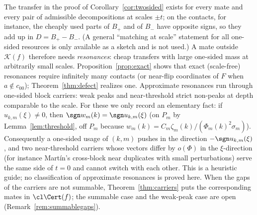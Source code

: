 \begin{remark}\label{rem:resonancetypes}
The transfer in the proof of Corollary~\ref{cor:twosided} exists for every
mate and every pair of admissible decompositions at scales $\pm t$; on the
contacts, for instance, the cheaply used parts of $B_+$ and of $B_-$ have
opposite signs, so they add up in $D=B_+-B_-$.  (A general ``matching at
scale'' statement for all one-sided resources is only available as a
sketch and is not used.)  A mate outside $\mathcal
K(f)$ therefore needs \emph{resonances}: cheap transfers with large
one-sided mass at arbitrarily small scales.  Proposition~\ref{prop:exact}
shows that exact (scale-free) resonances require infinitely many contacts
(or near-flip coordinates of $F$ when $a\notin c_{00}$);
Theorem~\ref{thm:defect} realizes one.  Approximate resonances run through
one-sided block carriers: weak peaks and near-threshold strict non-peaks
at depth comparable to the scale.  For these we only record an elementary
fact: if $u_{k,m}(\xi)\ne0$, then $\sgn w_m(k)=\sgn u_{k,m}(\xi)$ (on $P_m$
by Lemma~\ref{lem:threshold}, off $P_m$ because $w_m(k)=C_m\zeta_m(k)/
(\Phi_m(k)^2\sigma_m)$).  Consequently a one-sided usage of $(k,m)$ pushes in
the direction $-\sgn u_{k,m}(\xi)$, and two near-threshold carriers whose
vectors differ by $o(\Phi)$ in the $\xi$-direction (for instance Mart\'in's
cross-block near duplicates with small perturbations) serve the same side
of $t=0$ and cannot switch with each other.  This is a heuristic guide; no
classification of approximate resonances is proved here.  When the gaps of
the carriers are not summable, Theorem~\ref{thm:carriers} puts the
corresponding mates in $\cl\Cert(f)$; the summable case and the weak-peak
case are open (Remark~\ref{rem:summablegaps}).
\end{remark}

